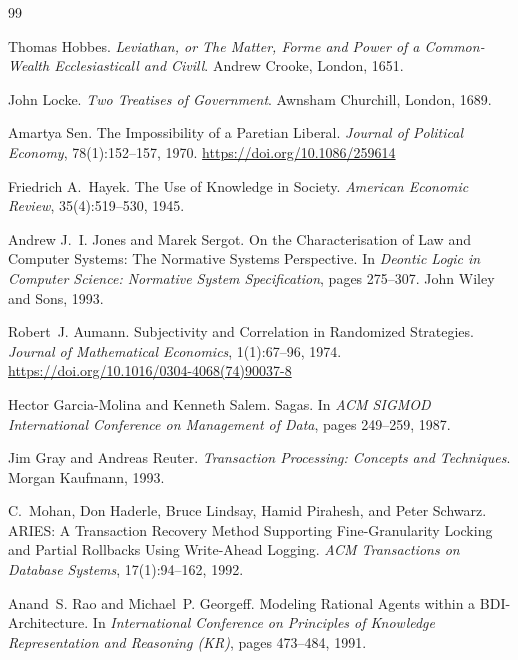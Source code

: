 \documentclass[11pt,a4paper]{article}
\theoremstyle{definition}
\theoremstyle{remark}
\begin{document}

\pdprintsolutions
\begin{thebibliography}{99}

Thomas Hobbes.
\newblock \textit{Leviathan, or The Matter, Forme and Power of a Common-Wealth Ecclesiasticall and Civill}.
\newblock Andrew Crooke, London, 1651.

John Locke.
\newblock \textit{Two Treatises of Government}.
\newblock Awnsham Churchill, London, 1689.

Amartya Sen.
\newblock The Impossibility of a Paretian Liberal.
\newblock \textit{Journal of Political Economy}, 78(1):152--157, 1970.
\newblock \url{https://doi.org/10.1086/259614}

Friedrich A.\ Hayek.
\newblock The Use of Knowledge in Society. \textit{American Economic Review}, 35(4):519--530, 1945.

Andrew J.~I. Jones and Marek Sergot.
\newblock On the Characterisation of Law and Computer Systems: The Normative Systems Perspective.
\newblock In \textit{Deontic Logic in Computer Science: Normative System Specification}, pages 275--307. John Wiley and Sons, 1993.

Robert~J. Aumann.
\newblock Subjectivity and Correlation in Randomized Strategies.
\newblock \textit{Journal of Mathematical Economics}, 1(1):67--96, 1974.
\newblock \url{https://doi.org/10.1016/0304-4068(74)90037-8}

Hector Garcia-Molina and Kenneth Salem.
\newblock Sagas.
\newblock In \textit{ACM SIGMOD International Conference on Management of Data}, pages 249--259, 1987.

Jim Gray and Andreas Reuter.
\newblock \textit{Transaction Processing: Concepts and Techniques}.
\newblock Morgan Kaufmann, 1993.

C.~Mohan, Don Haderle, Bruce Lindsay, Hamid Pirahesh, and Peter Schwarz.
\newblock ARIES: A Transaction Recovery Method Supporting Fine-Granularity Locking and Partial Rollbacks Using Write-Ahead Logging.
\newblock \textit{ACM Transactions on Database Systems}, 17(1):94--162, 1992.

Anand~S. Rao and Michael~P. Georgeff.
\newblock Modeling Rational Agents within a BDI-Architecture.
\newblock In \textit{International Conference on Principles of Knowledge Representation and Reasoning (KR)}, pages 473--484, 1991.


\end{thebibliography}
\end{document}
